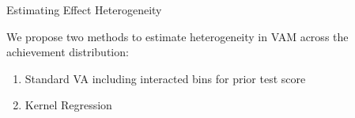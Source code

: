 \documentclass[11pt]{beamer}
\begin{document}

\begin{frame}{Estimating Effect Heterogeneity}

    We propose two methods to estimate heterogeneity in VAM across the achievement distribution:
    
    \begin{enumerate}
        \item Standard VA including interacted bins for prior test score
        \item Kernel Regression
    \end{enumerate}
    
\end{frame}





        

    
    





\end{document}
